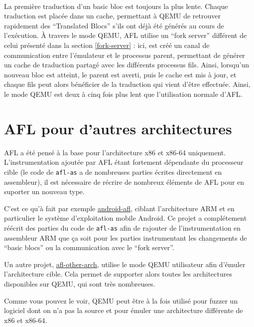 \paragraph{}
La première traduction d'un basic bloc est toujours la plus lente.
Chaque traduction est placée dans un cache, permettant à QEMU de retrouver rapidement des ``Translated Blocs'' s'ils ont déjà été générés au cours de l'exécution.
À travers le mode QEMU, AFL utilise un ``fork server'' différent de celui présenté dans la section \ref{fork-server} : ici, est créé un canal de communication entre l'émulateur et le processus parent, permettant de générer un cache de traduction partagé avec les différents processus fils.
Ainsi, lorsqu'un nouveau bloc est atteint, le parent est averti, puis le cache est mis à jour, et chaque fils peut alors bénéficier de la traduction qui vient d'être effectuée.
Ainsi, le mode QEMU est deux à cinq fois plus lent que l'utilisation normale d'AFL.

\section{AFL pour d'autres architectures}

AFL a été pensé à la base  pour l'architecture x86 et x86-64 uniquement.
L'instrumentation ajoutée par AFL étant fortement dépendante du processeur cible (le code de \lstinline{afl-as} a de nombreuses parties écrites directement en assembleur), il est nécessaire de récrire de nombreux éléments de AFL pour en suporter un nouveau type.

C'est ce qu'à fait par exemple \href{https://github.com/ele7enxxh/android-afl}{android-afl}, ciblant l'architecture ARM et en particulier le système d'exploitation mobile Android.
Ce projet a complétement réécrit des parties du code de \lstinline{afl-as} afin de rajouter de l'instrumentation en assembleur ARM que ça soit pour les parties instrumentant les changements de ``basic blocs'' ou la communication avec le ``fork server''.

Un autre projet, \href{https://github.com/shellphish/afl-other-arch}{afl-other-arch}, utilise le mode QEMU utilisateur afin d'émuler l'architecture cible.
Cela permet de supporter alors toutes les architectures disponibles sur QEMU, qui sont très nombreuses.

Comme vous pouvez le voir, QEMU peut être à la fois utilisé pour fuzzer un logiciel dont on n'a pas la source et pour émuler une architecture différente de x86 et x86-64.

